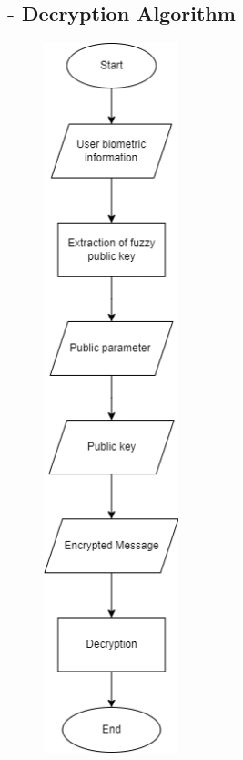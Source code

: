 \documentclass[graybox]{svmult}
\begin{document}
\subsection*{- Decryption Algorithm}
\begin{figure}[H]
    \centering
    \includegraphics[width=0.35\textwidth, keepaspectratio]{Decryption.png} %
    \label{fig:decryption-algorithm}
\end{figure}
\end{document}
